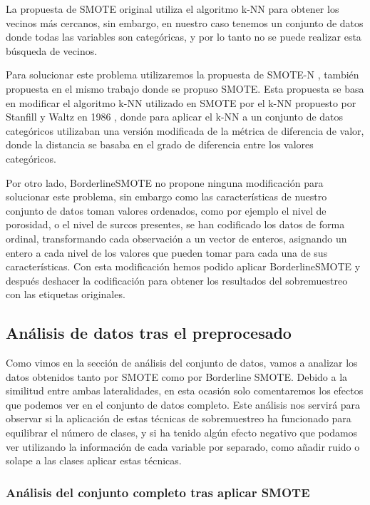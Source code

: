 La propuesta de SMOTE original utiliza el algoritmo k-NN para obtener los vecinos más cercanos, sin embargo, en nuestro caso tenemos un conjunto de datos donde todas las variables son categóricas, y por lo tanto no se puede realizar esta búsqueda de vecinos.

Para solucionar este problema utilizaremos la propuesta de SMOTE-N \cite{SMOTE}, también propuesta en el mismo trabajo donde se propuso SMOTE. Esta propuesta se basa en modificar el algoritmo k-NN utilizado en SMOTE por el k-NN propuesto por Stanfill y Waltz en 1986 \cite{kNNSMOTEN}, donde para aplicar el k-NN a un conjunto de datos categóricos utilizaban una versión modificada de la métrica de diferencia de valor, donde la distancia se basaba en el grado de diferencia entre los valores categóricos.

Por otro lado, BorderlineSMOTE no propone ninguna modificación para solucionar este problema, sin embargo como las características de nuestro conjunto de datos toman valores ordenados, como por ejemplo el nivel de porosidad, o el nivel de surcos presentes, se han codificado los datos de forma ordinal, transformando cada observación a un vector de enteros, asignando un entero a cada nivel de los valores que pueden tomar para cada una de sus características. Con esta modificación hemos podido aplicar BorderlineSMOTE y después deshacer la codificación para obtener los resultados del sobremuestreo con las etiquetas originales.

\subsection{Análisis de datos tras el preprocesado}

Como vimos en la sección de análisis del conjunto de datos, vamos a analizar los datos obtenidos tanto por SMOTE como por Borderline SMOTE. Debido a la similitud entre ambas lateralidades, en esta ocasión solo comentaremos los efectos que podemos ver en el conjunto de datos completo. Este análisis nos servirá para observar si la aplicación de estas técnicas de sobremuestreo ha funcionado para equilibrar el número de clases, y si ha tenido algún efecto negativo que podamos ver utilizando la información de cada variable por separado, como añadir ruido o solape a las clases aplicar estas técnicas.

\subsubsection{Análisis del conjunto completo tras aplicar SMOTE}


